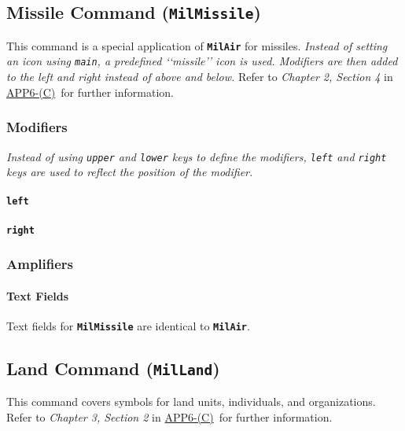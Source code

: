 \documentclass[a4paper, titlepage]{article}
\newcommand\DocLink{\href{https://www.awl.edu.pl/images/en/APP_6_C.pdf}{APP6-(C)}}
\begin{document}
\subsection{Missile Command (\textbf{\texttt{MilMissile}})}

This command is a special application of \textbf{\texttt{MilAir}} for missiles. \textit{Instead of setting an icon using \texttt{main}, a predefined \lq\lq{}missile\rq\rq{} icon is used. Modifiers are then added to the left and right instead of above and below.} Refer to \textit{Chapter 2, Section 4} in \DocLink\ for further information.

\subsubsection{Modifiers}

\textit{Instead of using \texttt{upper} and \texttt{lower} keys to define the modifiers, \texttt{left} and \texttt{right} keys are used to reflect the position of the modifier.}

\paragraph{\texttt{left}}\quad
%

\paragraph{\texttt{right}}\quad
%

\subsubsection{Amplifiers}

\paragraph{Text Fields}

Text fields for \textbf{\texttt{MilMissile}} are identical to \textbf{\texttt{MilAir}}.

\subsection{Land Command (\textbf{\texttt{MilLand}})}

This command covers symbols for land units, individuals, and organizations. Refer to \textit{Chapter 3, Section 2} in \DocLink\ for further information.
\end{document}

